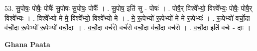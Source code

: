 \documentclass[17pt]{extarticle}
\begin{document}
53. सु॒पोषः॒ पोषैः॒ पोषैः᳚ सु॒पोषः॑ सु॒पोषः॒ पोषैः᳚ । . सु॒पोष॒ इति॑ सु - पोषः॑ । . पोषै॒र् विश्वे᳚भ्यो॒ विश्वे᳚भ्यः॒ पोषैः॒ पोषै॒र् विश्वे᳚भ्यः । . विश्वे᳚भ्यो मे मे॒ विश्वे᳚भ्यो॒ विश्वे᳚भ्यो मे । . मे॒ रू॒पेभ्यो॑ रू॒पेभ्यो॑ मे मे रू॒पेभ्यः॑ । . रू॒पेभ्यो॑ वर्चो॒दा व॑र्चो॒दा रू॒पेभ्यो॑ रू॒पेभ्यो॑ वर्चो॒दाः । . व॒र्चो॒दा वर्च॑से॒ वर्च॑से वर्चो॒दा व॑र्चो॒दा वर्च॑से । . व॒र्चो॒दा इति॑ वर्चः - दाः । \newline

\textbf{Ghana Paata } \newline
\end{document}
